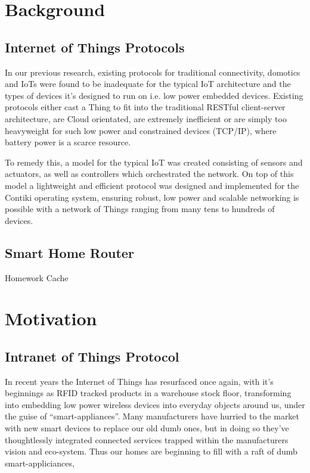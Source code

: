 \documentclass[conference]{./sty/IEEEtran}
\begin{document}
\section{Background} %
\label{sec:background}

\subsection{Internet of Things Protocols} %
\label{sub:internet_of_things_protocols}
In our previous research\cite{KNoT}, existing protocols for traditional connectivity, domotics and IoTs were found to be inadequate for the typical IoT architecture and the types of devices it's designed to run on i.e. low power embedded devices. Existing protocols either cast a Thing to fit into the traditional RESTful client-server architecture\cite{IETF_COAP_HTTP}, are Cloud orientated\cite{SmartThings,Twine}, are extremely inefficient\cite{xAP} or are simply too heavyweight for such low power and constrained devices (TCP/IP), where battery power is a scarce resource. 

To remedy this, a model for the typical IoT was created consisting of sensors and actuators, as well as controllers which orchestrated the network. On top of this model a lightweight and efficient protocol was designed and implemented for the Contiki operating system, ensuring robust, low power and scalable networking is possible with a network of Things ranging from many tens to hundreds of devices.

\subsection{Smart Home Router} %
\label{sub:integration}
Homework Cache \cite{InformationPlane} \cite{DEBSChallenge}


\section{Motivation} %
\label{sec:motivation}
\subsection{Intranet of Things Protocol} %
\label{sub:intranet_of_things_protocol}
In recent years the Internet of Things has resurfaced once again, with it's beginnings as RFID tracked products in a warehouse stock floor, transforming into embedding low power wireless devices into everyday objects around us, under the guise of ``smart-appliances''. Many manufacturers have hurried to the market with new smart devices to replace our old dumb ones, but in doing so they've thoughtlessly integrated connected services trapped within the manufacturers vision and eco-system. Thus our homes are beginning to fill with a raft of dumb smart-appliciances, 
\end{document}
